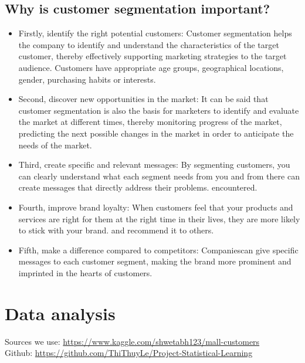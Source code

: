 \documentclass{article}
\begin{document}
\subsection{Why is customer segmentation important?}
\begin{itemize}

\item Firstly, identify the right potential customers: Customer segmentation helps the company to identify and understand the characteristics of the target customer, thereby effectively supporting marketing strategies to the target audience. Customers have appropriate age groups, geographical locations, gender, purchasing habits or interests.

\item Second, discover new opportunities in the market: It can be said that customer segmentation is also the basis for marketers to identify and evaluate the market at different times, thereby monitoring progress of the market, predicting the next possible changes in the market in order to anticipate the needs of the market.

\item Third, create specific and relevant messages: By segmenting customers, you can clearly understand what each segment needs from you and from there can create messages that directly address their problems. encountered.

\item Fourth, improve brand loyalty: When customers feel that your products and services are right for them at the right time in their lives, they are more likely to stick with your brand. and recommend it to others.

\item Fifth, make a difference compared to competitors: Companiescan give specific messages to each customer segment, making the brand more prominent and imprinted in the hearts of customers.

\end{itemize}

\section{Data analysis}

Sources we use: \href{https://www.kaggle.com/shwetabh123/mall-customers}{https://www.kaggle.com/shwetabh123/mall-customers}\\
Github: \href{https://github.com/ThiThuyLe/Project-Statistical-Learning}{https://github.com/ThiThuyLe/Project-Statistical-Learning}
\end{document}
